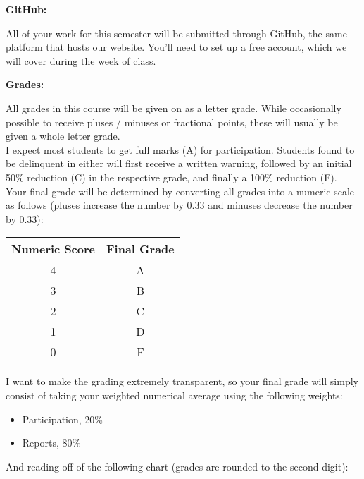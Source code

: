 \documentclass[12pt]{article}
\begin{document}
\vspace{0.4cm}

\textbf{GitHub:} \vspace{6pt}

All of your work for this semester will be submitted through GitHub,
the same platform that hosts our website. You'll need to set up a free
account, which we will cover during the week of class.

\vspace{0.4cm}

\textbf{Grades:} \vspace{6pt}

All grades in this course will be given on as a letter grade.
While occasionally possible to receive pluses / minuses or
fractional points, these will usually be given a whole letter grade. \\

I expect most students to get full marks (A) for participation.
Students found to be delinquent in either will first receive a written
warning, followed by an initial 50\% reduction (C) in the respective grade,
and finally a 100\% reduction (F). \\

Your final grade will be determined by converting all grades into
a numeric scale as follows (pluses increase the number by 0.33 and minuses
decrease the number by 0.33):

\begin{center}
\begin{tabular}{c || c}
Numeric Score & Final Grade \\
\hline \hline
4 & A  \\
3 & B  \\
2 & C  \\
1 & D  \\
0 & F
\end{tabular}
\end{center}

I want to make the grading extremely transparent, so your final grade will
simply consist of taking your weighted numerical average using the following
weights:

\begin{itemize}\setlength\itemsep{0em}
\item Participation, 20\%
\item Reports, 80\%
\end{itemize}

And reading off of the following chart (grades are rounded to the
second digit):
\end{document}
